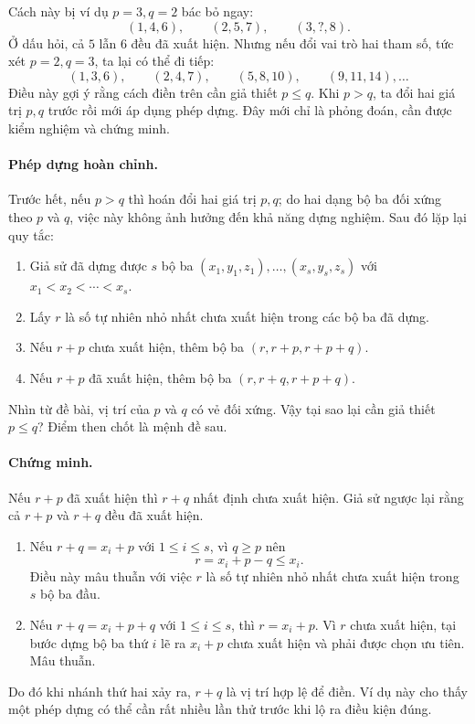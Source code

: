 \documentclass[11pt]{article}
\begin{document}
Cách này bị ví dụ $p=3,q=2$ bác bỏ ngay:
\[
  (1,4,6),\qquad (2,5,7),\qquad (3,?,8).
\]
Ở dấu hỏi, cả $5$ lẫn $6$ đều đã xuất hiện. Nhưng nếu đổi vai trò hai tham số,
tức xét $p=2,q=3$, ta lại có thể đi tiếp:
\[
  (1,3,6),\qquad (2,4,7),\qquad (5,8,10),\qquad (9,11,14),\ldots
\]
Điều này gợi ý rằng cách điền trên cần giả thiết $p\le q$. Khi $p>q$, ta đổi
hai giá trị $p,q$ trước rồi mới áp dụng phép dựng. Đây mới chỉ là phỏng đoán,
cần được kiểm nghiệm và chứng minh.

\paragraph{Phép dựng hoàn chỉnh.}
Trước hết, nếu $p>q$ thì hoán đổi hai giá trị $p,q$; do hai dạng bộ ba đối
xứng theo $p$ và $q$, việc này không ảnh hưởng đến khả năng dựng nghiệm.
Sau đó lặp lại quy tắc:
\begin{enumerate}
  \item Giả sử đã dựng được $s$ bộ ba
  $(x_1,y_1,z_1),\ldots,(x_s,y_s,z_s)$ với
  $x_1<x_2<\cdots<x_s$.
  \item Lấy $r$ là số tự nhiên nhỏ nhất chưa xuất hiện trong các bộ ba đã dựng.
  \item Nếu $r+p$ chưa xuất hiện, thêm bộ ba $(r,r+p,r+p+q)$.
  \item Nếu $r+p$ đã xuất hiện, thêm bộ ba $(r,r+q,r+p+q)$.
\end{enumerate}

Nhìn từ đề bài, vị trí của $p$ và $q$ có vẻ đối xứng. Vậy tại sao lại cần giả
thiết $p\le q$? Điểm then chốt là mệnh đề sau.

\paragraph{Chứng minh.}
Nếu $r+p$ đã xuất hiện thì $r+q$ nhất định chưa xuất hiện.
Giả sử ngược lại rằng cả $r+p$ và $r+q$ đều đã xuất hiện.
\begin{enumerate}
  \item Nếu $r+q=x_i+p$ với $1\le i\le s$, vì $q\ge p$ nên
  \[
    r=x_i+p-q\le x_i.
  \]
  Điều này mâu thuẫn với việc $r$ là số tự nhiên nhỏ nhất chưa xuất hiện trong
  $s$ bộ ba đầu.
  \item Nếu $r+q=x_i+p+q$ với $1\le i\le s$, thì $r=x_i+p$.
  Vì $r$ chưa xuất hiện, tại bước dựng bộ ba thứ $i$ lẽ ra $x_i+p$ chưa xuất
  hiện và phải được chọn ưu tiên. Mâu thuẫn.
\end{enumerate}
Do đó khi nhánh thứ hai xảy ra, $r+q$ là vị trí hợp lệ để điền. Ví dụ này cho
thấy một phép dựng có thể cần rất nhiều lần thử trước khi lộ ra điều kiện đúng.
\end{document}
